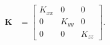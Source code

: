 \begin{align}
    \textbf{K} &= \left[ \begin{array}{ccc}
                 K_{xx}  & 0       & 0  \\
                 0       & K_{yy}  & 0  \\
                 0       & 0       & K_{zz}  \end{array} \right].
  \label{conddiag}
\end{align}

